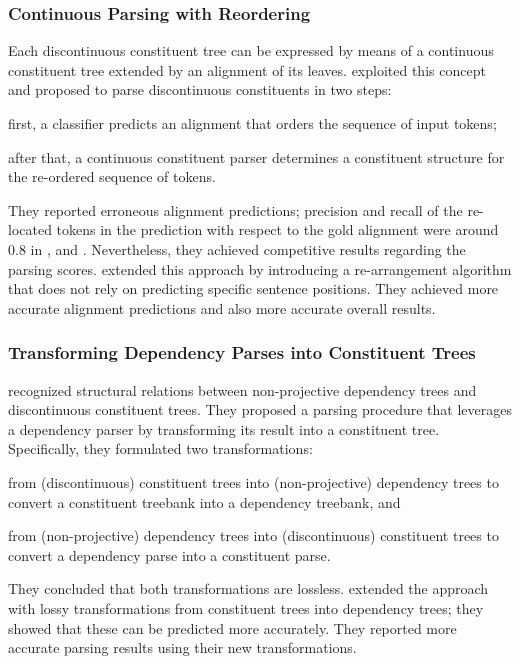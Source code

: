 \documentclass[../document.tex]{subfiles}
\begin{document}
    \subsubsection*{Continuous Parsing with Reordering}
    Each discontinuous constituent tree can be expressed by means of a continuous constituent tree extended by an alignment of its leaves.
     exploited this concept and proposed to parse discontinuous constituents in two steps:
    \begin{inparaenum}[]
        \item first, a classifier predicts an alignment that orders the sequence of input tokens; 
        \item after that, a continuous constituent parser determines a constituent structure for the re-ordered sequence of tokens.
    \end{inparaenum}
    They reported erroneous alignment predictions; precision and recall of the re-located tokens in the prediction with respect to the gold alignment were around $0.8$ in \dptb{}, \negra{} and \tiger{}.
    Nevertheless, they achieved competitive results regarding the parsing scores.
     extended this approach by introducing a re-arrangement algorithm that does not rely on predicting specific sentence positions.
    They achieved more accurate alignment predictions and also more accurate overall results.

    \subsubsection*{Transforming Dependency Parses into Constituent Trees}
     recognized structural relations between non-projective dependency trees and discontinuous constituent trees.
    They proposed a parsing procedure that leverages a dependency parser by transforming its result into a constituent tree.
    Specifically, they formulated two transformations:
    \begin{inparaenum}
        \item from (discontinuous) constituent trees into (non-projective) dependency trees to convert a constituent treebank into a dependency treebank, and
        \item from (non-projective) dependency trees into (discontinuous) constituent trees to convert a dependency parse into a constituent parse.
    \end{inparaenum}
    They concluded that both transformations are lossless.
     extended the approach with lossy transformations from constituent trees into dependency trees; they showed that these can be predicted more accurately.
    They reported more accurate parsing results using their new transformations.
\end{document}
